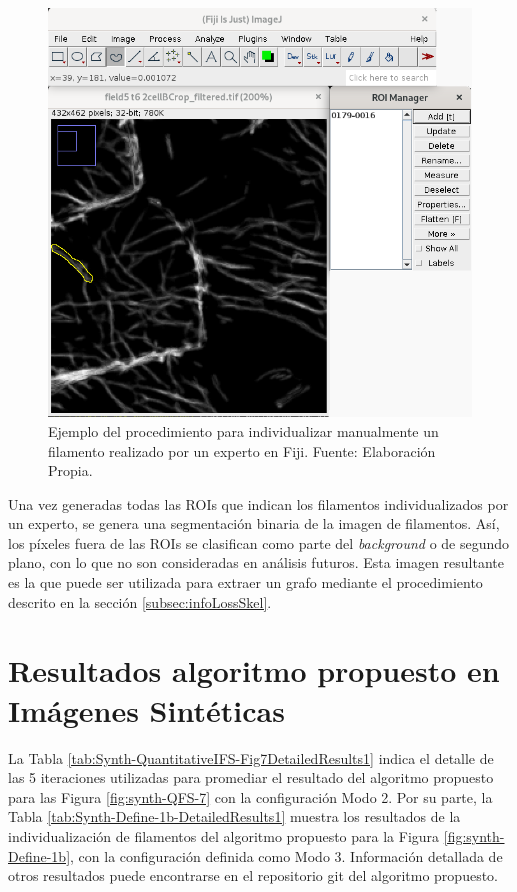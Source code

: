 \begin{figure}[h]
    \centering
    \includegraphics[scale=0.4]{imagenes/IndivManualFijiROI.png}
    \caption[Ejemplo de un filamento individualizado manualmente]{Ejemplo del procedimiento para individualizar manualmente un filamento realizado por un experto en Fiji. Fuente: Elaboraci\'on Propia.}
    \label{fig:roiExample}
\end{figure}

Una vez generadas todas las ROIs que indican los filamentos individualizados por un experto, se genera una segmentaci\'on binaria de la imagen de filamentos. As\'i, los p\'ixeles fuera de las ROIs se clasifican como parte del {\it background} o de segundo plano, con lo que no son consideradas en an\'alisis futuros. Esta imagen resultante es la que puede ser utilizada para extraer un grafo mediante el procedimiento descrito en la secci\'on \ref{subsec:infoLossSkel}.

\section{Resultados algoritmo propuesto en Im\'agenes Sint\'eticas}

La Tabla \ref{tab:Synth-QuantitativeIFS-Fig7DetailedResults1} indica el detalle de las 5 iteraciones utilizadas para promediar el resultado del algoritmo propuesto para las Figura \ref{fig:synth-QFS-7} con la configuraci\'on Modo 2. Por su parte, la Tabla  \ref{tab:Synth-Define-1b-DetailedResults1} muestra los resultados de la individualizaci\'on de filamentos del algoritmo propuesto para la Figura \ref{fig:synth-Define-1b}, con la configuraci\'on definida como Modo 3. Informaci\'on detallada de otros resultados puede encontrarse en el repositorio git del algoritmo propuesto.

